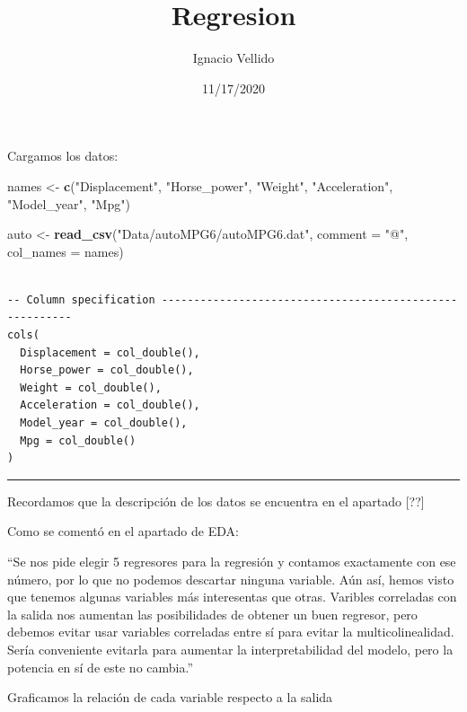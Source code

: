 \documentclass[
]{article}
\title{Regresion}
\author{Ignacio Vellido}
\date{11/17/2020}
\newenvironment{Shaded}{\begin{snugshade}}{\end{snugshade}}
\newcommand{\DataTypeTok}[1]{\textcolor[rgb]{0.13,0.29,0.53}{#1}}
\newcommand{\KeywordTok}[1]{\textcolor[rgb]{0.13,0.29,0.53}{\textbf{#1}}}
\newcommand{\NormalTok}[1]{#1}
\newcommand{\StringTok}[1]{\textcolor[rgb]{0.31,0.60,0.02}{#1}}
\begin{document}
\maketitle

Cargamos los datos:

\begin{Shaded}
\begin{Highlighting}[]
\NormalTok{names <-}\StringTok{ }\KeywordTok{c}\NormalTok{(}\StringTok{"Displacement"}\NormalTok{, }\StringTok{"Horse_power"}\NormalTok{, }\StringTok{"Weight"}\NormalTok{, }\StringTok{"Acceleration"}\NormalTok{, }\StringTok{"Model_year"}\NormalTok{, }\StringTok{"Mpg"}\NormalTok{)}

\NormalTok{auto <-}\StringTok{ }\KeywordTok{read_csv}\NormalTok{(}\StringTok{"Data/autoMPG6/autoMPG6.dat"}\NormalTok{, }\DataTypeTok{comment =} \StringTok{"@"}\NormalTok{, }\DataTypeTok{col_names =}\NormalTok{ names)}
\end{Highlighting}
\end{Shaded}

\begin{verbatim}

-- Column specification --------------------------------------------------------
cols(
  Displacement = col_double(),
  Horse_power = col_double(),
  Weight = col_double(),
  Acceleration = col_double(),
  Model_year = col_double(),
  Mpg = col_double()
)
\end{verbatim}

\begin{center}\rule{0.5\linewidth}{0.5pt}\end{center}

Recordamos que la descripción de los datos se encuentra en el apartado
{[}??{]}

Como se comentó en el apartado de EDA:

``Se nos pide elegir 5 regresores para la regresión y contamos
exactamente con ese número, por lo que no podemos descartar ninguna
variable. Aún así, hemos visto que tenemos algunas variables más
interesentas que otras. Varibles correladas con la salida nos aumentan
las posibilidades de obtener un buen regresor, pero debemos evitar usar
variables correladas entre sí para evitar la multicolinealidad. Sería
conveniente evitarla para aumentar la interpretabilidad del modelo, pero
la potencia en sí de este no cambia.''

Graficamos la relación de cada variable respecto a la salida
\end{document}

